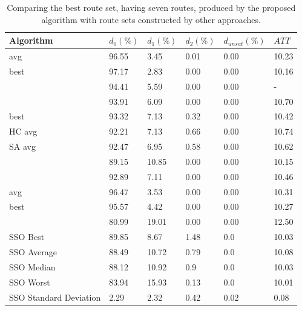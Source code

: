     \begin{table}[H]
    \centering
    \begin{tabular}{|l||l|l|l|l|l|}
    \hline
    Algorithm & $d_0(\%)$ & $d_1(\%)$ & $d_2(\%)$ & $d_{unsat}(\%)$ & $ATT$ \\
    \hline
    \citet{kechagiopoulos14} avg & 96.55 & 3.45 & 0.01 & 0.00 & 10.23 \\
    \citet{kechagiopoulos14} best & 97.17 & 2.83 & 0.00 & 0.00 & 10.16 \\
    \citet{nikolic14} & 94.41 & 5.59 & 0.00 & 0.00 & - \\
    \citet{kidwai98} & 93.91 & 6.09 & 0.00 & 0.00 & 10.70 \\
    \citet{fan10} best & 93.32 & 7.13 & 0.32 & 0.00 & 10.42  \\
    \citet{fan10} HC avg & 92.21 & 7.13 & 0.66 & 0.00 & 10.74 \\
    \citet{fan10} SA avg & 92.47 & 6.95 & 0.58 & 0.00 & 10.62 \\
    \citet{chakroborty02} & 89.15 & 10.85 & 0.00 & 0.00 & 10.15 \\
    \citet{zhang10} & 92.89 & 7.11 & 0.00 & 0.00 & 10.46 \\
    \citet{chew12} avg & 96.47 & 3.53 & 0.00 & 0.00 & 10.31 \\
    \citet{chew12} best & 95.57 & 4.42 & 0.00 & 0.00 & 10.27 \\
    \citet{baaj91} & 80.99 & 19.01 & 0.00 & 0.00 & 12.50 \\
    \hline
    \hline
    SSO Best & 89.85 & 8.67 & 1.48 & 0.0 & 10.03\\
    SSO Average & 88.49 & 10.72 & 0.79 & 0.0 & 10.08\\
    SSO Median & 88.12 & 10.92 & 0.9 & 0.0 & 10.03\\
    SSO Worst & 83.94 & 15.93 & 0.13 & 0.0 & 10.01\\
    SSO Standard Deviation & 2.29 & 2.32 & 0.42 & 0.02 & 0.08\\
    \hline
    \end{tabular}
    \caption {Comparing the best route set, having seven routes, produced by the proposed algorithm with route sets constructed by other approaches.}
    \label{table:performanceComparison_7}
    \end{table}

